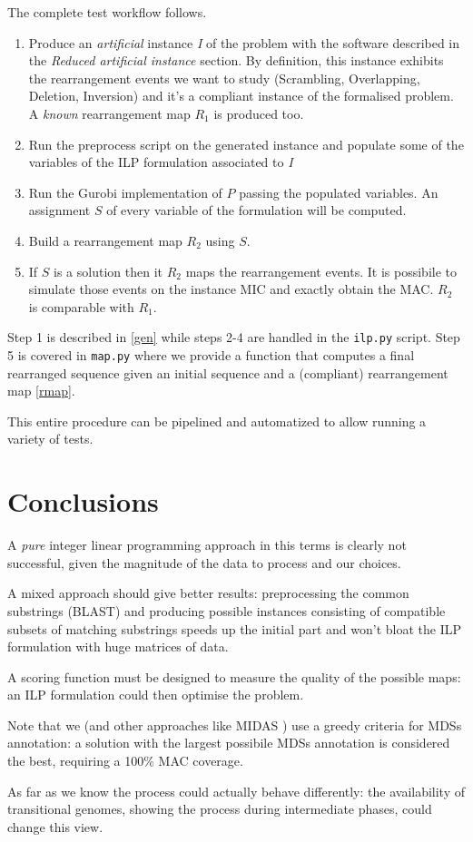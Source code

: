 The complete test workflow follows.

\begin{enumerate}
	\item Produce an \textit{artificial} instance \textit{I} of the problem with the software described in the \textit{Reduced artificial instance} section. By definition, this instance exhibits the rearrangement events we want to study (Scrambling, Overlapping, Deletion, Inversion) and it's a compliant instance of the formalised problem. A \textit{known} rearrangement map $R_1$ is produced too.
	\item Run the preprocess script on the generated instance and populate some of the variables of the ILP formulation associated to \textit{I}
	\item Run the Gurobi implementation of $P$ passing the populated variables. An assignment $S$ of every variable of the formulation will be computed.
	\item Build a rearrangement map $R_2$ using $S$.
	\item If $S$ is a solution then it $R_2$ maps the rearrangement events. It is possibile to simulate those events on the instance MIC and exactly obtain the MAC. $R_2$ is comparable with $R_1$.
\end{enumerate}

Step 1 is described in \ref{gen} while steps 2-4 are handled in the \texttt{ilp.py} script. Step 5 is covered in \texttt{map.py} where we provide a function that computes a final rearranged sequence given an initial sequence and a (compliant) rearrangement map \ref{rmap}.

This entire procedure can be pipelined and automatized to allow running a variety of tests.

\section{Conclusions}

A \textit{pure} integer linear programming approach in this terms is clearly not successful, given the magnitude of the data to process and our choices.

A mixed approach should give better results: preprocessing the common substrings (BLAST) and producing possible instances consisting of compatible subsets of matching substrings speeds up the initial part and won't bloat the ILP formulation with huge matrices of data.

A scoring function must be designed to measure the quality of the possible maps: an ILP formulation could then optimise the problem.

Note that we (and other approaches like MIDAS \cite{midas}) use a greedy criteria for MDSs annotation: a solution with the largest possibile MDSs annotation is considered the best, requiring a 100\% MAC coverage.

As far as we know the process could actually behave differently: the availability of transitional genomes, showing the process during intermediate phases, could change this view.